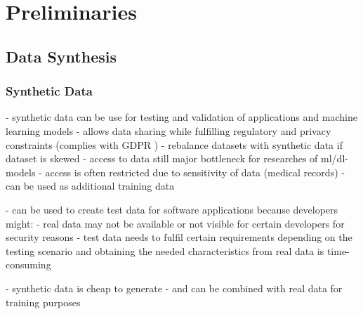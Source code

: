\chapter{Preliminaries}
\label{ch:preliminaries}

\section{Data Synthesis}
\label{ch:preliminaries-dataSynthesis}

\subsection{Synthetic Data}
\label{ch:preliminaries-dataSynthesis-syntheticData}

- synthetic data can be use for testing and validation of applications \cite{gilad2021SynthesizingLinkedData} and machine learning models \cite{dahmen2019SynSysSyntheticData}
- allows data sharing \cite{hernandez2022SyntheticDataGeneration} while fulfilling regulatory and privacy constraints \cite{zhao2022CTABGANEnhancingTabular} (complies with GDPR \cite{zhao2022CTABGANEnhancingTabular})
- rebalance datasets with synthetic data if dataset is skewed \cite{zhao2022CTABGANEnhancingTabular}
- access to data still major bottleneck for researches of ml/dl-models \cite{fan2020RelationalDataSynthesisa}
- access is often restricted due to sensitivity of data (medical records) \cite{esteban2017RealvaluedMedicalTimea}
- can be used as additional training data \cite{kim2021OCTGANNeuralODEbased}

- can be used to create test data for software applications because developers might:\cite{whiting2008CreatingRealisticScenariobased}
    - real data may not be available or not visible for certain developers for security reasons \cite{whiting2008CreatingRealisticScenariobased}
    - test data needs to fulfil certain requirements depending on the testing scenario and obtaining the needed characteristics from real data is time-consuming \cite{whiting2008CreatingRealisticScenariobased}


- synthetic data is cheap to generate \cite{leminh2021AirGenGANbasedSynthetica}
- and can be combined with real data for training purposes \cite{leminh2021AirGenGANbasedSynthetica}

